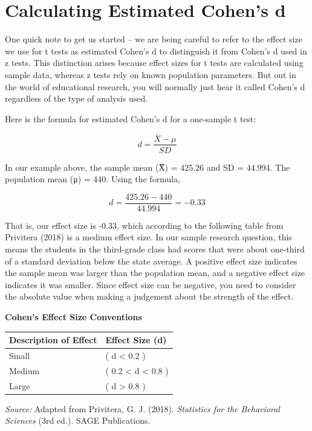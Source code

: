 \documentclass[
  letterpaper,
  DIV=11,
  numbers=noendperiod]{scrreprt}
\begin{document}
\section{Calculating Estimated Cohen's
d}\label{calculating-estimated-cohens-d}

One quick note to get us started -- we are being careful to refer to the
effect size we use for t tests as estimated Cohen's d to distinguish it
from Cohen's d used in z tests. This distinction arises because effect
sizes for t tests are calculated using sample data, whereas z tests rely
on known population parameters. But out in the world of educational
research, you will normally just hear it called Cohen's d regardless of
the type of analysis used.

Here is the formula for estimated Cohen's d for a one-sample t test:

\[
d = \frac{\bar{X} - \mu}{SD}
\]

In our example above, the sample mean (X̅) = 425.26 and SD = 44.994. The
population mean (μ) = 440. Using the formula,

\[
d
= \frac{425.26 - 440}{44.994}
= -0.33
\]

That is, our effect size is -0.33, which according to the following
table from Privitera (2018) is a medium effect size. In our sample
research question, this means the students in the third-grade class had
scores that were about one-third of a standard deviation below the state
average. A positive effect size indicates the sample mean was larger
than the population mean, and a negative effect size indicates it was
smaller. Since effect size can be negative, you need to consider the
absolute value when making a judgement about the strength of the effect.

\textbf{Cohen's Effect Size Conventions}

\begin{longtable}[]{@{}ll@{}}
\toprule\noalign{}
Description of Effect & Effect Size (d) \\
\midrule\noalign{}
\endhead
\bottomrule\noalign{}
\endlastfoot
Small & ( d \textless{} 0.2 ) \\
Medium & ( 0.2 \textless{} d \textless{} 0.8 ) \\
Large & ( d \textgreater{} 0.8 ) \\
\end{longtable}

\emph{Source:} Adapted from Privitera, G. J. (2018). \emph{Statistics
for the Behavioral Sciences} (3rd ed.). SAGE Publications.
\end{document}
